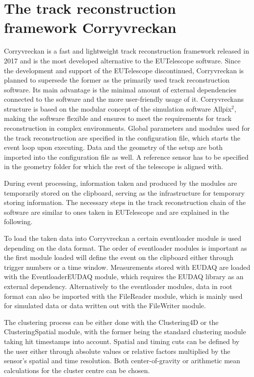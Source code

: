 \section{The track reconstruction framework Corryvreckan}
Corryvreckan is a fast and lightweight track reconstruction framework released in 2017 and is the most developed alternative to the EUTelescope software.
Since the development and support of the EUTelescope discontinued, Corryvreckan is planned to supersede the former as the primarily used track
reconstruction software. Its main advantage is the minimal amount of external dependencies connected to the software and the more user-friendly usage of
it.
Corryvreckans structure is based on the modular concept of the simulation software Allpix$^2$, making the software flexible and ensures to meet the requirements for track reconstruction in
complex environments. Global parameters and modules used for the track reconstruction are specified in the configuration file, which starts the event loop upon
executing. Data and the geometry of the setup are both imported into the configuration file as well. A reference sensor has to be specified in the geometry folder
for which the rest of the telescope is aligned with.

During event processing, information taken and produced by the modules are temporarily stored on the clipboard, serving as the infrastructure for temporary
storing information. %
The necessary steps in the track reconstruction chain of the software are similar to ones taken in EUTelescope and are explained in the following.

To load the taken data into Corryvreckan a certain eventloader module is used depending on the data format. The order of eventloader modules
is important as the first module loaded will define the event on the clipboard either through trigger numbers or a time window. Measurements stored with EUDAQ are loaded with the
EventloaderEUDAQ module, which requires the EUDAQ library as an external dependency. Alternatively to the eventloader modules, data in root format can also be imported
with the FileReader module, which is mainly used for simulated data or data written out with the FileWriter module.

The clustering process can be either done with the Clustering4D or the ClusteringSpatial module, with the former being the standard clustering module taking hit timestamps
into account. Spatial and timing cuts can be defined by the user either through absolute values or relative factors multiplied by the sensor's spatial and time resolution. Both
center-of-gravity or arithmetic mean calculations for the cluster centre can be chosen.


